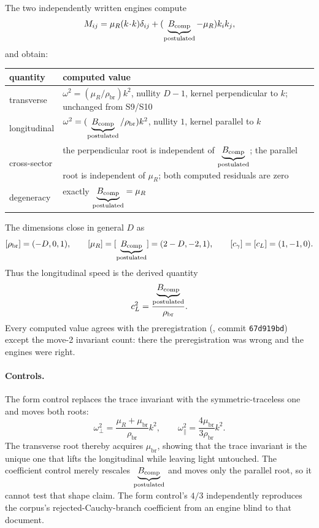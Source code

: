 The two independently written engines compute
\[
  M_{ij}=\mu_R(k\!\cdot\!k)\delta_{ij}
         +(\underbrace{B_{\mathrm{comp}}}_{\text{\scriptsize postulated}}-\mu_R)k_i k_j,
\]
and obtain:
\begin{center}
\begin{tabular}{@{}L{0.24\textwidth}L{0.65\textwidth}@{}}
\toprule
quantity & computed value \\
\midrule
transverse &
\(\omega^2=(\mu_R/\rho_{\mathrm{br}})k^2\), nullity \(D-1\), kernel
perpendicular to \(k\); unchanged from S9/S10 \\
longitudinal &
\(\omega^2=(\underbrace{B_{\mathrm{comp}}}_{\text{\scriptsize postulated}}/\rho_{\mathrm{br}})k^2\), nullity \(1\), kernel
parallel to \(k\) \\
cross-sector &
the perpendicular root is independent of \(\underbrace{B_{\mathrm{comp}}}_{\text{\scriptsize postulated}}\); the parallel root is
independent of \(\mu_R\); both computed residuals are zero \\
degeneracy & exactly \(\underbrace{B_{\mathrm{comp}}}_{\text{\scriptsize postulated}}=\mu_R\) \\
\bottomrule
\end{tabular}
\end{center}

The dimensions close in general \(D\) as
\[
  [\rho_{\mathrm{br}}]=(-D,0,1),
  \qquad
  [\mu_R]=[\underbrace{B_{\mathrm{comp}}}_{\text{\scriptsize postulated}}]=(2-D,-2,1),
  \qquad
  [c_\gamma]=[c_L]=(1,-1,0).
\]
Thus the longitudinal speed is the derived quantity
\[
  c_L^2=\frac{\underbrace{B_{\mathrm{comp}}}_{\text{\scriptsize postulated}}}{\rho_{\mathrm{br}}}.
\]
Every computed value agrees with the preregistration
(,
commit \texttt{67d919bd}) except the move-2 invariant count: there the
preregistration was wrong and the engines were right.

\paragraph{Controls.}
The form control replaces the trace invariant with the
symmetric-traceless one and moves both roots:
\[
  \omega_\perp^2=\frac{\mu_R+\mu_{\mathrm{br}}}{\rho_{\mathrm{br}}}k^2,
  \qquad
  \omega_\parallel^2=\frac{4\mu_{\mathrm{br}}}{3\rho_{\mathrm{br}}}k^2.
\]
The transverse root thereby acquires \(\mu_{\mathrm{br}}\), showing that the
trace invariant is the unique one that lifts the longitudinal while leaving
light untouched. The coefficient control merely rescales \(\underbrace{B_{\mathrm{comp}}}_{\text{\scriptsize postulated}}\) and
moves only the parallel root, so it cannot test that shape claim. The form
control's \(4/3\) independently reproduces the corpus's rejected-Cauchy-branch
coefficient from an engine blind to that document.

